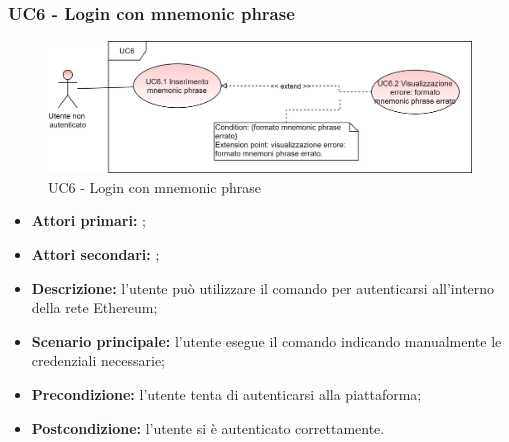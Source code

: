 \subsubsection{UC6 - Login con mnemonic phrase}
\begin{figure}[h]
	\centering
	\includegraphics[scale=\ucs]{./res/img/UC6.png}
	\caption {UC6 - Login con mnemonic phrase}
\end{figure}
\begin{itemize}
	\item \textbf{Attori primari:} \una{};
	\item \textbf{Attori secondari:} \re{};
	\item \textbf{Descrizione:} l’utente può utilizzare il comando \ploginMnemonic{} per autenticarsi all’interno della rete Ethereum; 
	\item \textbf{Scenario principale:} l'utente esegue il comando \login{} indicando manualmente le credenziali necessarie; 
	\item \textbf{Precondizione:} l’utente tenta di autenticarsi alla piattaforma;
	\item \textbf{Postcondizione:} l’utente si è autenticato correttamente.
\end{itemize}